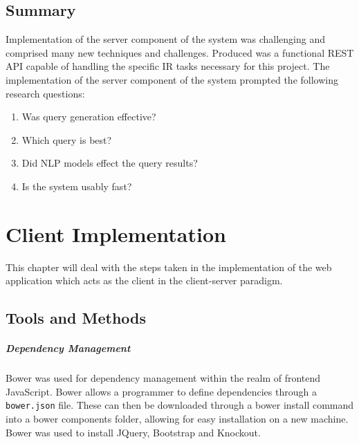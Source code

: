 \documentclass{l4proj}
\newcommand{\code}[1]{\texttt{#1}}
\begin{document}
\section{Summary} \label{serversummary}
Implementation of the server component of the system was challenging and comprised many new techniques and challenges. Produced was a functional REST API capable of handling the specific IR tasks necessary for this project.
The implementation of the server component of the system prompted the following research questions:
\begin{center}
\begin{enumerate}[label=\textbf{Server.\arabic*}]
\item Was query generation effective?
\item Which query is best?
\item Did NLP models effect the query results?
\item Is the system usably fast?
\end{enumerate}
\end{center}

\chapter{Client Implementation} \label{clientimplementation}
This chapter will deal with the steps taken in the implementation of the web application which acts as the client in the client-server paradigm.

\section{Tools and Methods}
\paragraph{Dependency Management}
Bower was used for dependency management within the realm of frontend JavaScript. Bower allows a programmer to define dependencies through a \code{bower.json} file. These can then be downloaded through a bower install command into a bower components folder, allowing for easy installation on a new machine. Bower was used to install JQuery, Bootstrap and Knockout.
\end{document}
